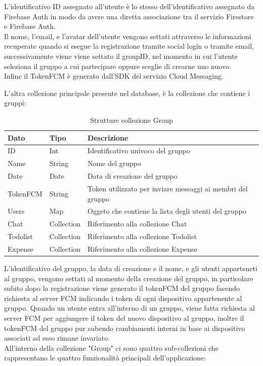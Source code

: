 L'identificativo ID assegnato all'utente è lo stesso dell'identificativo assegnato da Firebase Auth in modo da avere una diretta associazione tra il servizio Firestore e Firebase Auth.\\
Il nome, l'email, e l'avatar dell'utente vengono settati attraverso le informazioni recuperate quando si esegue la registrazione tramite social login o tramite email, successivamente viene viene settato il groupID, nel momento in cui l'utente seleziona il gruppo a cui partecipare oppure sceglie di crearne uno nuovo.\\
Infine il TokenFCM è generato dall'SDK del servizio Cloud Messaging.

\newpage

L'altra collezione principale presente nel database, è la collezione che contiene i gruppi:

\begin{table}[h]
\begin{center}
\begin{tabular}{|l|l|p{10cm}|}
    \hline
\textbf{Dato} & \textbf{Tipo}  & \textbf{Descrizione}\\ \hline
ID & Int & Identificativo univoco del gruppo\\\hline
Name & String & Nome del gruppo \\ \hline
Date & Date & Data di creazione del gruppo \\ \hline
TokenFCM & String & Token utilizzato per inviare messaggi ai membri del gruppo \\ \hline
Users & Map & Oggeto che contiene la lista degli utenti del gruppo  \\ \hline
Chat & Collection &  Riferimento alla collezione Chat \\ \hline
Todolist & Collection &  Riferimento alla collezione Todolist \\ \hline
Expense & Collection & Riferimento alla collezione Expense \\
\hline
\end{tabular}
\caption[Struttura Group]{Strutture collezione Group}\label{tab:Struttura collezione Group}
\end{center}
\end{table}
L'identificativo del gruppo, la data di creazione e il nome, e gli utenti apparteneti al gruppo, vengono settati al momento della creazione del gruppo, in particolare subito dopo la registrazione viene generato il tokenFCM del gruppo facendo richiesta al server FCM indicando i token di ogni dispositivo appartenente al gruppo.
Quando un utente entra all'interno di un gruppo, viene fatta richiesta al server FCM per aggiungere il token del nuovo dispositivo al gruppo, inoltre il tokenFCM del gruppo pur subendo cambiamenti interni in base ai dispositivo associati ad esso rimane invariato.\\
All'interno della collezione "Group" ci sono quattro sub-collezioni che rappresentano le quattro funzionalità principali dell'applicazione:

